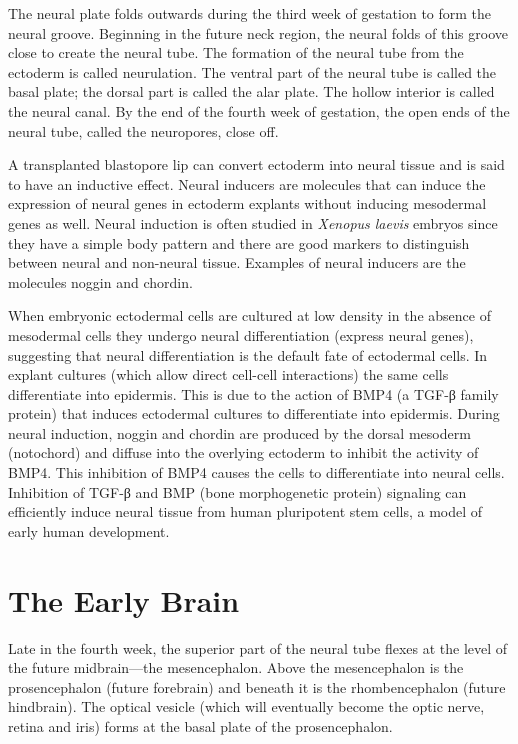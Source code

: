 \documentclass[]{book}
\begin{document}
The neural plate folds outwards during the third week of gestation to form the neural groove. Beginning in the future neck region, the neural folds of this groove close to create the neural tube. The formation of the neural tube from the ectoderm is called neurulation. The ventral part of the neural tube is called the basal plate; the dorsal part is called the alar plate. The hollow interior is called the neural canal. By the end of the fourth week of gestation, the open ends of the neural tube, called the neuropores, close off.

A transplanted blastopore lip can convert ectoderm into neural tissue and is said to have an inductive effect. Neural inducers are molecules that can induce the expression of neural genes in ectoderm explants without inducing mesodermal genes as well. Neural induction is often studied in \emph{Xenopus laevis} embryos since they have a simple body pattern and there are good markers to distinguish between neural and non-neural tissue. Examples of neural inducers are the molecules noggin and chordin.

When embryonic ectodermal cells are cultured at low density in the absence of mesodermal cells they undergo neural differentiation (express neural genes), suggesting that neural differentiation is the default fate of ectodermal cells. In explant cultures (which allow direct cell-cell interactions) the same cells differentiate into epidermis. This is due to the action of BMP4 (a TGF-β family protein) that induces ectodermal cultures to differentiate into epidermis. During neural induction, noggin and chordin are produced by the dorsal mesoderm (notochord) and diffuse into the overlying ectoderm to inhibit the activity of BMP4. This inhibition of BMP4 causes the cells to differentiate into neural cells. Inhibition of TGF-β and BMP (bone morphogenetic protein) signaling can efficiently induce neural tissue from human pluripotent stem cells, a model of early human development.

\hypertarget{the-early-brain}{%
\section{The Early Brain}\label{the-early-brain}}

Late in the fourth week, the superior part of the neural tube flexes at the level of the future midbrain---the mesencephalon. Above the mesencephalon is the prosencephalon (future forebrain) and beneath it is the rhombencephalon (future hindbrain). The optical vesicle (which will eventually become the optic nerve, retina and iris) forms at the basal plate of the prosencephalon.
\end{document}
